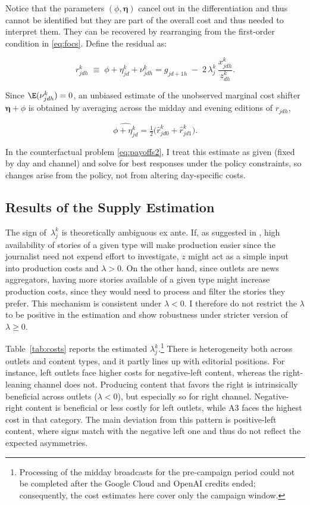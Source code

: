 \documentclass[12pt]{article}
\begin{document}
Notice that the parameters $\left(\phi,\bm\eta \right)$ cancel out in the differentiation and thus cannot be identified but they are part of the overall cost and thus needed to interpret them. They can be recovered by rearranging from the   first-order condition in \eqref{eq:focs}. Define the residual as:

\[
r_{jdh}^k \;\equiv\;\phi+\eta_{jd}^k+ \nu_{jdh}^k= {{g}_{jd+1h}} \;-\; 2\,{{\lambda}}_j^k\,\frac{x_{jdh}^k}{z_{dh}^k}.
\]


Since $\E(\nu_{jdh}^k)=0$, an unbiased estimate of the unobserved marginal cost shifter $\bm\eta + \phi$ is obtained by averaging across the midday and evening editions of $r_{jdh}$,


\[
\widehat{\phi +\eta_{jd}^k} = \tfrac{1}{2}\big(\hat{r}_{jd0}^k+\hat{r}_{jd1}^k\big).
\]


In the counterfactual problem \eqref{eq:payoffs2}, I treat this estimate  as given (fixed by day and channel) and solve for best responses under the policy constraints, so changes arise from the policy, not from altering day-specific costs.



\subsection{Results of the Supply Estimation}

 The sign of~$\lambda_j^k$ is theoretically ambiguous ex ante. If, as suggested in \cite{SimonovRao2022}, high availability of stories of a given type will make production easier since the journalist need not expend effort to investigate,  $z$ might act as a simple input into production costs and $ \lambda>0$. On the other hand, since outlets are news aggregators, having more stories available of a given type might increase production costs, since they would need to process and filter the stories they prefer. This mechanism is consistent under $ \lambda<0$. I therefore do not restrict the $\lambda$ to be positive in the estimation and show robustness under stricter version of $\lambda \geq0$.


Table~\ref{tab:costs} reports the estimated $\lambda_j^k$.\footnote{Processing of the midday broadcasts for the pre‑campaign period could not be completed after the Google Cloud and OpenAI credits ended; consequently, the cost estimates here cover only the campaign window. } There is heterogeneity both  across outlets and content types, and it partly lines up with editorial positions. For instance, left outlets face higher costs for negative-left content, whereas the right-leaning channel does not. Producing content that favors the right is intrinsically beneficial across outlets ($\lambda<0$), but especially so for right channel. Negative-right content is beneficial or less costly for left outlets, while A3 faces the highest cost in that category. The main deviation from this pattern is positive-left content, where signs match with the negative left one and thus do not reflect the expected asymmetries. 
\end{document}
